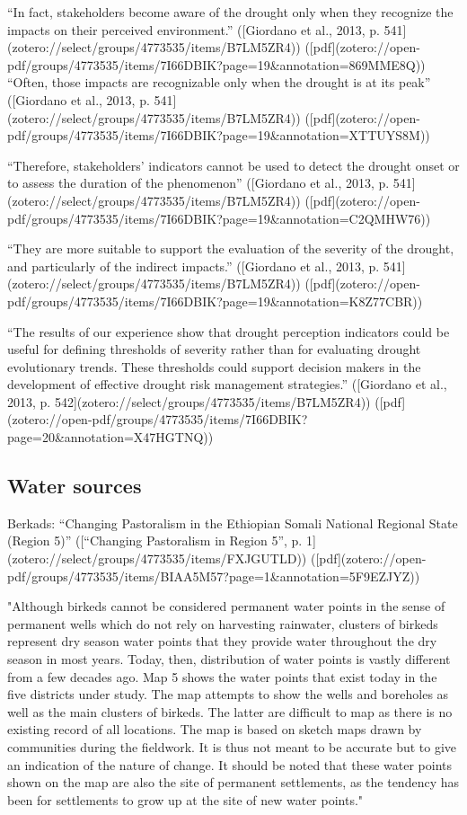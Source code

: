 {{“In fact, stakeholders become aware of the drought only when they recognize the impacts on their perceived environment.” ([Giordano et al., 2013, p. 541](zotero://select/groups/4773535/items/B7LM5ZR4)) ([pdf](zotero://open-pdf/groups/4773535/items/7I66DBIK?page=19&annotation=869MME8Q))
“Often, those impacts are recognizable only when the drought is at its peak” ([Giordano et al., 2013, p. 541](zotero://select/groups/4773535/items/B7LM5ZR4)) ([pdf](zotero://open-pdf/groups/4773535/items/7I66DBIK?page=19&annotation=XTTUYS8M))

“Therefore, stakeholders’ indicators cannot be used to detect the drought onset or to assess the duration of the phenomenon” ([Giordano et al., 2013, p. 541](zotero://select/groups/4773535/items/B7LM5ZR4)) ([pdf](zotero://open-pdf/groups/4773535/items/7I66DBIK?page=19&annotation=C2QMHW76))

“They are more suitable to support the evaluation of the severity of the drought, and particularly of the indirect impacts.” ([Giordano et al., 2013, p. 541](zotero://select/groups/4773535/items/B7LM5ZR4)) ([pdf](zotero://open-pdf/groups/4773535/items/7I66DBIK?page=19&annotation=K8Z77CBR))

“The results of our experience show that drought perception indicators could be useful for defining thresholds of severity rather than for evaluating drought evolutionary trends. These thresholds could support decision makers in the development of effective drought risk management strategies.” ([Giordano et al., 2013, p. 542](zotero://select/groups/4773535/items/B7LM5ZR4)) ([pdf](zotero://open-pdf/groups/4773535/items/7I66DBIK?page=20&annotation=X47HGTNQ))


\subsection{Water sources}
Berkads:
“Changing Pastoralism in the Ethiopian Somali National Regional State (Region 5)” ([“Changing Pastoralism in Region 5”, p. 1](zotero://select/groups/4773535/items/FXJGUTLD)) ([pdf](zotero://open-pdf/groups/4773535/items/BIAA5M57?page=1&annotation=5F9EZJYZ))

"Although birkeds cannot be considered permanent water points in the sense of permanent wells which do not rely on harvesting rainwater, clusters of birkeds represent dry season water points that they provide water throughout the dry season in most years. Today, then, distribution of water points is vastly different from a few decades ago. Map 5 shows the water points that exist today in the five districts under study. The map attempts to show the wells and boreholes as well as the main clusters of birkeds. The latter are difficult to map as there is no existing record of all locations. The map is based on sketch maps drawn by communities during the fieldwork. It is thus not meant to be accurate but to give an indication of the nature of change. It should be noted that these water points shown on the map are also the site of permanent settlements, as the tendency has been for settlements to grow up at the site of new water points."

}}
